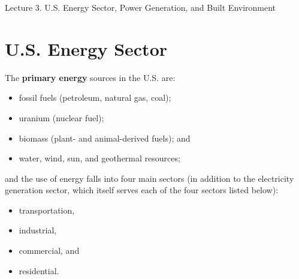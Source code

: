 \documentclass[10pt]{article}
\begin{document}
   \noindent
   \begin{center}

   \hrulefill
   
   \vspace{5pt}
   
   \vspace{0pt}
   
   {\Large \hfill  Lecture 3. U.S. Energy Sector, Power Generation, and Built Environment}
   \vspace{5pt}
   
  
   \hrulefill
   \end{center}
   
{}


\section{U.S. Energy Sector}
The \textbf{primary energy} sources in the U.S. are:

\begin{itemize}
    \item fossil fuels (petroleum, natural gas, coal);
    \item uranium (nuclear fuel); 
    \item biomass (plant- and animal-derived fuels); and
    \item water, wind, sun, and geothermal resources;
\end{itemize}


and the use of energy falls into four main sectors (in addition to the electricity generation sector, which itself serves each of the four sectors listed below):

\begin{itemize}
    \item transportation,
    \item industrial, 
    \item commercial, and
    \item residential.
\end{itemize}
\end{document}
